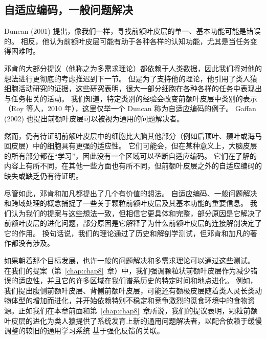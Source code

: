 \subsection{自适应编码，一般问题解决}
Duncan (2001) 提出，像我们一样，寻找前额叶皮层的单一、基本功能可能是错误的。 相反，他认为前额叶皮层可能有助于各种各样的认知功能，尤其是当任务变得困难时。
\par 
邓肯的大部分提议（他称之为多需求理论）都依赖于人类数据，因此我们将对他的想法进行更彻底的考虑推迟到下一节。 但是为了支持他的理论，他引用了类人猿细胞活动研究的证据，这些研究表明，很大一部分细胞在各种各样的任务中表现出与任务相关的活动。 我们知道，特定类别的经验会改变前额叶皮层中类别的表示（Roy 等人，2010 年），这里仅举一个 Duncan 称为自适应编码的例子。 Gaffan (2002) 也提出前额叶皮层可以被视为通用的问题解决者。
\par 
然而，仍有待证明前额叶皮层中的细胞比大脑其他部分（例如后顶叶、颞叶或海马回皮层）中的细胞具有更强的适应性。 它们可能会，但在某种意义上，大脑皮层的所有部分都在“学习”，因此没有一个区域可以垄断自适应编码。 它们在了解的内容上有所不同，在其他一些方面也有所不同，但前额叶皮层之外的自适应编码的缺失或缺乏仍有待证明。
\par 
尽管如此，邓肯和加凡都提出了几个有价值的想法。 自适应编码、一般问题解决和跨域处理的概念捕捉了一些关于颗粒前额叶皮层及其基本功能的重要信息。 我们认为我们的提案与这些想法一致，但相信它更具体和完整，部分原因是它解决了前额叶皮层的进化问题，部分原因是它解释了为什么前额叶皮层的连接解剖决定了它的作用。 换句话说，我们的理论通过了历史和解剖学测试，但邓肯和加凡的著作都没有涉及。
\par 
如果朝着那个目标发展，也许一般的问题解决和多需求理论可以通过这些测试。 在我们的提案（第~\ref{chap:chap8}~章）中，我们强调颗粒状前额叶皮层作为减少错误的适应性，并且它的许多区域在我们谱系历史的特定时间和地点进化。 例如，我们提出腹侧前额叶皮层、背侧前额叶皮层，可能还有额极皮层随着类人灵长类动物体型的增加而进化，并开始依赖特别不稳定和竞争激烈的觅食环境中的食物资源。正如我们在本章前面和第~\ref{chap:chap8}~章所说，我们的提议表明，颗粒前额叶皮层的进化为类人猿提供了系统发育上新的通用问题解决者，以配合依赖于缓慢调整的较旧的通用学习系统 基于强化反馈的关联。
